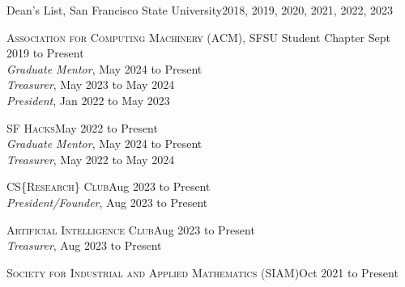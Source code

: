 \documentclass[hidelinks, 10pt]{article}
\begin{document}
{\begin{minipage}[ct]{0.9\linewidth}
    \vspace{1.5mm}

    Dean's List, San Francisco State University\hfill 2018, 2019, 2020, 2021, 2022, 2023
\end{minipage}

\vspace{7mm}


\hrulefill

\vspace{4mm}

\begin{minipage}[ct]{0.9\linewidth}
    \textsc{Association for Computing Machinery} (ACM), SFSU Student Chapter\hfill
    Sept 2019 to Present\\
    \emph{Graduate Mentor}, May 2024 to Present\\
    \emph{Treasurer}, May 2023 to May 2024\\
    \emph{President}, Jan 2022 to May 2023

    \vspace{1.5mm}

    \textsc{SF Hacks}\hfill May 2022 to Present\\
    \emph{Graduate Mentor}, May 2024 to Present\\
    \emph{Treasurer}, May 2022 to May 2024

    \vspace{1.5mm}

    \textsc{CS}\{\textsc{Research}\}\textsc{ Club}\hfill Aug 2023 to Present\\
    \emph{President/Founder}, Aug 2023 to Present

    \vspace{1.5mm}

    \textsc{Artificial Intelligence Club}\hfill Aug 2023 to Present\\
    \emph{Treasurer}, Aug 2023 to Present

    \vspace{1.5mm}

    \textsc{Society for Industrial and Applied Mathematics} (SIAM)\hfill Oct 2021 to Present\\
\end{minipage}

\vspace{4mm}
\pagebreak

}
\end{document}
